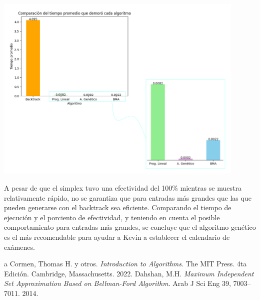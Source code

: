 \documentclass[10pt]{article} %
\begin{document}
    \begin{center}
    	\includegraphics[width=12cm]{Bar_comparative_plot.png}
    \end{center}
	
	A pesar de que el simplex tuvo una efectividad del 100\% mientras se muestra relativamente r\'apido, no se garantiza que para entradas m\'as grandes que las que pueden generarse con el backtrack sea eficiente. Comparando el tiempo de ejecuci\'on y el porciento de efectividad, y teniendo en cuenta el posible comportamiento para entradas m\'as grandes, se concluye que el algoritmo gen\'etico es el m\'as recomendable para ayudar a Kevin a establecer el calendario de ex\'amenes.
	
	\begin{thebibliography}
		a
		 Cormen, Thomas H. y otros. \emph{Introduction to Algorithms}. 
		The MIT Press.
		4ta Edici\'on.		
		Cambridge, Massachusetts.
		2022.
		 Dahshan, M.H. 
		\emph{Maximum Independent Set Approximation Based on Bellman-Ford Algorithm}. 
		Arab J Sci Eng 39, 
		7003–7011. 2014. 
	\end{thebibliography}
\end{document}
